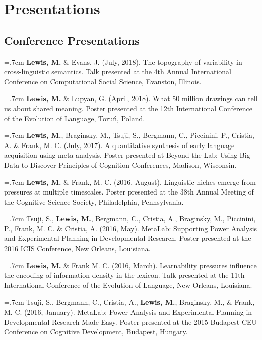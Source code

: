 \documentclass[letterpaper]{article}
\begin{document}
 \singlespacing
 
\section*{Presentations}

\subsection*{Conference Presentations}

 \hangindent=.7cm {\bf Lewis, M.} \& Evans, J. (July, 2018). The topography of variability in cross-linguistic semantics. Talk presented at the 4th Annual International Conference on Computational Social Science, Evanston, Illinois.

 \hangindent=.7cm {\bf Lewis, M.} \& Lupyan, G. (April, 2018). What 50 million drawings can tell us about shared meaning. Poster presented at the 12th International Conference of the Evolution of Language, Toru\'{n}, Poland.

 \hangindent=.7cm {\bf Lewis, M.}, Braginsky, M., Tsuji, S., Bergmann, C., Piccinini, P., Cristia, A. \& Frank, M. C. (July, 2017). A quantitative synthesis of early language acquisition using meta-analysis. Poster presented at Beyond the Lab: Using Big Data to Discover Principles of Cognition Conferences, Madison, Wisconsin.

\hangindent=.7cm {\bf Lewis, M.} \& Frank, M. C. (2016, August).  Linguistic niches emerge from pressures at multiple timescales. Poster presented at the 38th Annual Meeting of the Cognitive Science Society, Philadelphia, Pennsylvania.

 \hangindent=.7cm  Tsuji, S., {\bf Lewis, M.}, Bergmann, C., Cristia, A.,  Braginsky, M.,  Piccinini, P., Frank, M. C. \& Cristia, A. (2016, May). MetaLab: Supporting Power Analysis and Experimental Planning in Developmental Research. Poster presented at the 2016 ICIS Conference, New Orleans, Louisiana.


  \hangindent=.7cm {\bf Lewis, M.} \& Frank M. C. (2016, March). Learnability pressures influence the encoding of information density in the lexicon. Talk presented at the 11th International Conference of the Evolution of Language, New Orleans, Louisiana.
  
  \hangindent=.7cm  Tsuji, S., Bergmann, C., Cristia, A., {\bf Lewis, M.}, Braginsky, M., \& Frank, M. C. (2016, January). MetaLab: Power Analysis and Experimental Planning in Developmental Research Made Easy. Poster presented at the 2015 Budapest CEU Conference on Cognitive Development, Budapest, Hungary.
\end{document}
